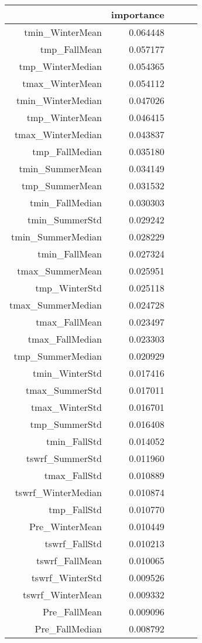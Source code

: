 \begin{tabular}{rrrrr}
\toprule
 & importance \\
\midrule
tmin_WinterMean & 0.064448 \\
tmp_FallMean & 0.057177 \\
tmp_WinterMedian & 0.054365 \\
tmax_WinterMean & 0.054112 \\
tmin_WinterMedian & 0.047026 \\
tmp_WinterMean & 0.046415 \\
tmax_WinterMedian & 0.043837 \\
tmp_FallMedian & 0.035180 \\
tmin_SummerMean & 0.034149 \\
tmp_SummerMean & 0.031532 \\
tmin_FallMedian & 0.030303 \\
tmin_SummerStd & 0.029242 \\
tmin_SummerMedian & 0.028229 \\
tmin_FallMean & 0.027324 \\
tmax_SummerMean & 0.025951 \\
tmp_WinterStd & 0.025118 \\
tmax_SummerMedian & 0.024728 \\
tmax_FallMean & 0.023497 \\
tmax_FallMedian & 0.023303 \\
tmp_SummerMedian & 0.020929 \\
tmin_WinterStd & 0.017416 \\
tmax_SummerStd & 0.017011 \\
tmax_WinterStd & 0.016701 \\
tmp_SummerStd & 0.016408 \\
tmin_FallStd & 0.014052 \\
tswrf_SummerStd & 0.011960 \\
tmax_FallStd & 0.010889 \\
tswrf_WinterMedian & 0.010874 \\
tmp_FallStd & 0.010770 \\
Pre_WinterMean & 0.010449 \\
tswrf_FallStd & 0.010213 \\
tswrf_FallMean & 0.010065 \\
tswrf_WinterStd & 0.009526 \\
tswrf_WinterMean & 0.009332 \\
Pre_FallMean & 0.009096 \\
Pre_FallMedian & 0.008792 \\

\end{tabular}
